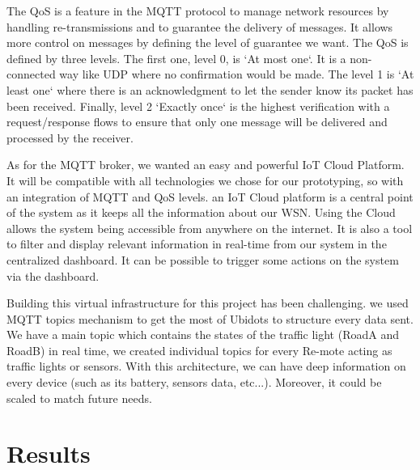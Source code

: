 
The QoS is a feature in the MQTT protocol to manage network resources by handling re-transmissions and to guarantee the delivery of messages.
It allows more control on messages by defining the level of guarantee we want.
The QoS is defined by three levels.
The first one,
	level 0,
	is `At most one`.
It is a non-connected way like UDP where no confirmation would be made.
The level 1 is `At least one` where there is an acknowledgment to let the sender know its packet has been received.
Finally,
	level 2 `Exactly once` is the highest verification with a request/response flows to ensure that only one message will be delivered and processed by the receiver.


As for the MQTT broker,
we wanted an easy and powerful IoT Cloud Platform.
It will be compatible with all technologies we chose for our prototyping,
	so with an integration of MQTT and QoS levels.
an IoT Cloud platform is a central point of the system as it keeps all the information about our WSN.
Using the Cloud allows the system being accessible from anywhere on the internet.
It is also a tool to filter and display relevant information in real-time from our system in the centralized dashboard.
It can be possible to trigger some actions on the system via the dashboard.

Building this virtual infrastructure for this project has been challenging.
we used MQTT topics mechanism to get the most of Ubidots to structure every data sent.
We have a main topic which contains the states of the traffic light (RoadA and RoadB) in real time,
	we created individual topics for every Re-mote acting as traffic lights or sensors.
With this architecture,
	we can have deep information on every device (such as its battery,
	sensors data,
	etc...).
Moreover,
	it could be scaled to match future needs.

\section{Results} \label{sec:Prototyping}


